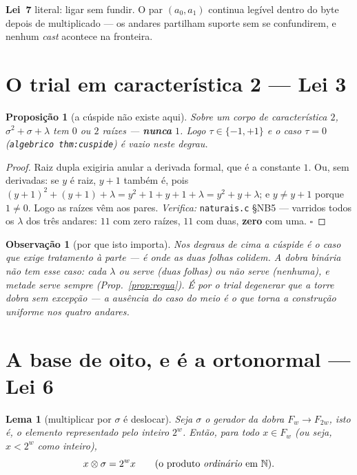 \documentclass[11pt,a4paper]{article}
\newtheorem{proposicao}[teorema]{Proposição}
\newtheorem{lema}[teorema]{Lema}
\newtheorem{observacao}{Observação}
\newcommand{\code}[1]{\texttt{\small #1}}
\begin{document}
\noindent\textbf{Lei~7} literal: ligar sem fundir. O par $(a_0,a_1)$ continua
legível dentro do byte depois de multiplicado --- os andares partilham suporte
sem se confundirem, e nenhum \emph{cast} acontece na fronteira.

\section{O trial em característica 2 --- Lei 3}\label{sec:trial}

\begin{proposicao}[a cúspide não existe aqui]\label{prop:trial}
Sobre um corpo de característica $2$, $\sigma^2+\sigma+\lambda$ tem $0$ ou $2$
raízes --- \textbf{nunca} $1$. Logo $\tau\in\{-1,+1\}$ e o caso $\tau=0$
(\code{algebrico thm:cuspide}) é vazio neste degrau.
\end{proposicao}

\begin{proof}
Raiz dupla exigiria anular a derivada formal, que é a constante $1$. Ou, sem
derivadas: se $y$ é raiz, $y+1$ também é, pois
$(y+1)^2+(y+1)+\lambda=y^2+1+y+1+\lambda=y^2+y+\lambda$; e $y\neq y+1$ porque
$1\neq0$. Logo as raízes vêm aos pares.
\emph{Verifica:} \code{naturais.c} §NB5 --- varridos todos os $\lambda$ dos
três andares: $11$ com zero raízes, $11$ com duas, \textbf{zero} com uma. $\square$
\end{proof}

\begin{observacao}[por que isto importa]
Nos degraus de cima a cúspide é o caso que exige tratamento à parte --- é onde
as duas folhas colidem. A dobra binária não tem esse caso: cada $\lambda$ ou
serve (duas folhas) ou não serve (nenhuma), e metade serve sempre
(Prop.~\ref{prop:regua}). \emph{É por o trial degenerar que a torre dobra sem
excepção} --- a ausência do caso do meio é o que torna a construção uniforme
nos quatro andares.
\end{observacao}

\section{A base de oito, e é a ortonormal --- Lei 6}\label{sec:base}

\begin{lema}[multiplicar por $\sigma$ é deslocar]\label{lem:desloc}
Seja $\sigma$ o gerador da dobra $F_w\to F_{2w}$, isto é, o elemento
representado pelo inteiro $2^{w}$. Então, para todo $x\in F_w$ (ou seja,
$x<2^{w}$ como inteiro),
\[
x\otimes\sigma=2^{w}x\qquad\text{(o produto \emph{ordinário} em }\mathbb{N}).
\]
\end{lema}
\end{document}
